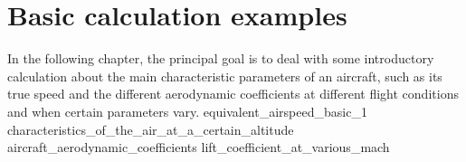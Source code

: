 \documentclass[[12pt,twoside]{book}
\begin{document}
%
%
\chapter%
   [Basic calculation examples]%
   {Basic calculation examples}
\label{chap:Basics}

\setcounter{minitocdepth}{2}%
\minitoc %

\vspace{\baselineskip}

\noindent
In the following chapter, the  principal goal is to deal with some introductory calculation about the main characteristic parameters of an aircraft, such as its true speed and the different aerodynamic coefficients
at different flight conditions and when certain parameters vary.
% 
{equivalent_airspeed_basic_1}
{characteristics_of_the_air_at_a_certain_altitude}
{aircraft_aerodynamic_coefficients}
{lift_coefficient_at_various_mach}
\end{document}
